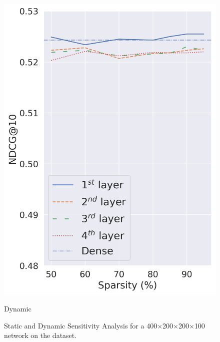 \begin{figure}[t]
\begin{minipage}[b]{0.5\columnwidth}
\includegraphics[width=\columnwidth]{imgs/dynamic_sensitivity.png}
\centering 
\caption*{\footnotesize{Dynamic}}
\end{minipage}%
\caption{Static and Dynamic Sensitivity Analysis for a 400$\times$200$\times$200$\times$100 network on the \msn dataset.}
\label{fig:sensitivity}
\end{figure}



